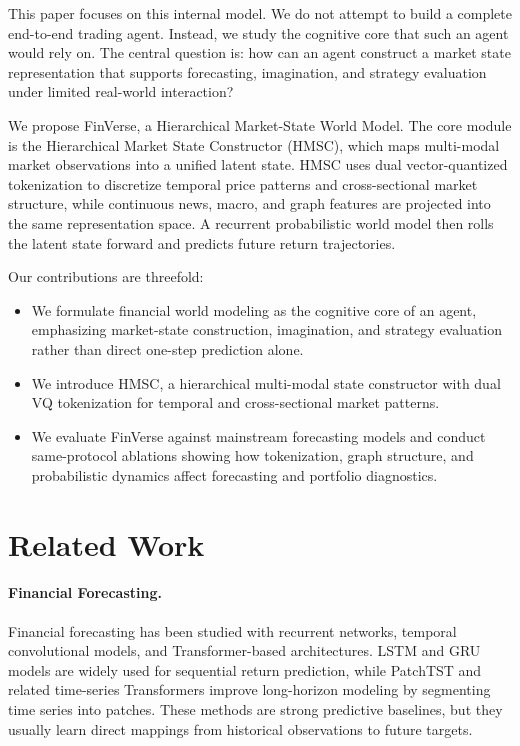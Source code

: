 \documentclass[letterpaper]{article}
\begin{document}
This paper focuses on this internal model. We do not attempt to build a complete end-to-end trading agent. Instead, we study the cognitive core that such an agent would rely on. The central question is: how can an agent construct a market state representation that supports forecasting, imagination, and strategy evaluation under limited real-world interaction?

We propose FinVerse, a Hierarchical Market-State World Model. The core module is the Hierarchical Market State Constructor (HMSC), which maps multi-modal market observations into a unified latent state. HMSC uses dual vector-quantized tokenization to discretize temporal price patterns and cross-sectional market structure, while continuous news, macro, and graph features are projected into the same representation space. A recurrent probabilistic world model then rolls the latent state forward and predicts future return trajectories.

Our contributions are threefold:
\begin{itemize}
    \item We formulate financial world modeling as the cognitive core of an agent, emphasizing market-state construction, imagination, and strategy evaluation rather than direct one-step prediction alone.
    \item We introduce HMSC, a hierarchical multi-modal state constructor with dual VQ tokenization for temporal and cross-sectional market patterns.
    \item We evaluate FinVerse against mainstream forecasting models and conduct same-protocol ablations showing how tokenization, graph structure, and probabilistic dynamics affect forecasting and portfolio diagnostics.
\end{itemize}

\section{Related Work}
\paragraph{Financial Forecasting.}
Financial forecasting has been studied with recurrent networks, temporal convolutional models, and Transformer-based architectures. LSTM and GRU models are widely used for sequential return prediction, while PatchTST and related time-series Transformers improve long-horizon modeling by segmenting time series into patches. These methods are strong predictive baselines, but they usually learn direct mappings from historical observations to future targets.
\end{document}

